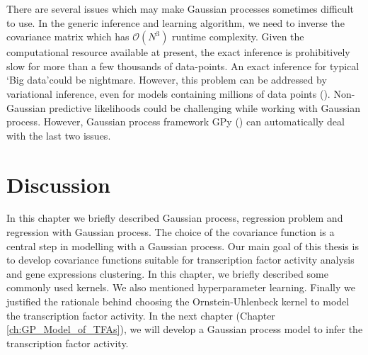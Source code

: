 There are several issues which may make Gaussian processes sometimes difficult to use. In the generic inference and learning algorithm, we need to inverse the covariance matrix which has $\mathcal{O}\left(N^3\right)$ runtime complexity. Given the computational resource available at present, the exact inference is prohibitively slow for more than a few thousands of data-points. An exact inference for typical \lq Big data\rq  could be nightmare. However, this problem can be addressed by variational inference, even for models containing millions of data points (\cite{Hensman:2013a}). Non-Gaussian predictive likelihoods could be challenging while working with Gaussian process. However, Gaussian process framework GPy (\cite{gpy2014}) can automatically deal with the last two issues. 

\section{Discussion}
In this chapter we briefly described Gaussian process, regression problem and regression with Gaussian process. The choice of the covariance function is a central step in modelling with a Gaussian process. Our main goal of this thesis is to develop covariance functions suitable for transcription factor activity analysis and gene expressions clustering. In this chapter, we briefly described some commonly used kernels. We also mentioned hyperparameter learning. Finally we justified the rationale behind choosing the Ornstein-Uhlenbeck kernel to model the transcription factor activity. In the next chapter (Chapter \ref{ch:GP_Model_of_TFAs}), we will develop a Gaussian process model to infer the transcription factor activity.